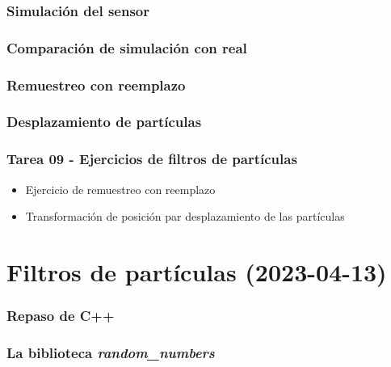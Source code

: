 \begin{frame}\frametitle{Simulación del sensor}
\end{frame}

\begin{frame}\frametitle{Comparación de simulación con real}
\end{frame}

\begin{frame}\frametitle{Remuestreo con reemplazo}
\end{frame}

\begin{frame}\frametitle{Desplazamiento de partículas}
\end{frame}

\begin{frame}\frametitle{Tarea 09 - Ejercicios de filtros de partículas}
  \begin{itemize}
  \item Ejercicio de remuestreo con reemplazo
  \item Transformación de posición par desplazamiento de las partículas
  \end{itemize}
\end{frame}

\section{Filtros de partículas (2023-04-13)}

\begin{frame}\frametitle{Repaso de C++}
\end{frame}

\begin{frame}\frametitle{La biblioteca \textit{random\_numbers}}
\end{frame}


